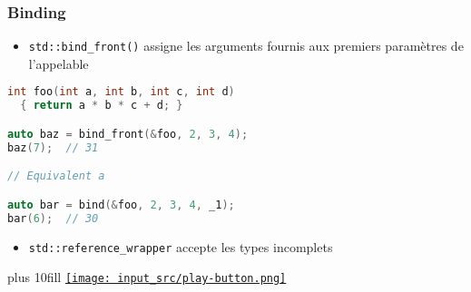\documentclass[C++.tex]{subfiles}
\begin{document}
\begin{frame}[fragile]
	\frametitle{Binding}
	\begin{itemize}
		\item \lstinline|std::bind_front()| assigne les arguments fournis aux premiers paramètres de l'appelable
	\end{itemize}

	\begin{lstlisting}[language=C++]
int foo(int a, int b, int c, int d)
  { return a * b * c + d; }

auto baz = bind_front(&foo, 2, 3, 4);
baz(7);  // 31

// Equivalent a

auto bar = bind(&foo, 2, 3, 4, _1);
bar(6);  // 30\end{lstlisting}

	\begin{itemize}
		\item \lstinline|std::reference_wrapper| accepte les types incomplets

	\end{itemize}

	\vskip 5mm plus 10fill
	\hfill
	\href{https://godbolt.org/#g:!((g:!((g:!((h:codeEditor,i:(filename:'1',fontScale:14,fontUsePx:'0',j:1,lang:c%2B%2B,selection:(endColumn:1,endLineNumber:19,positionColumn:1,positionLineNumber:19,selectionStartColumn:1,selectionStartLineNumber:1,startColumn:1,startLineNumber:1),source:'%23include+%3Cfunctional%3E%0A%23include+%3Ciostream%3E%0A%0Aint+foo(int+a,+int+b,+int+c,+int+d)%0A%7B%0A++return+a+*+b+*+c+%2B+d%3B%0A%7D%0A%0Aint+main()%0A%7B%0A++std::cout+%3C%3C+foo(2,+3,+4,+5)+%3C%3C+%22%5Cn%22%3B%0A%0A++auto+bar+%3D+std::bind(%26foo,+2,+3,+4,+std::placeholders::_1)%3B%0A++std::cout+%3C%3C+bar(6)+%3C%3C+%22%5Cn%22%3B%0A%0A++auto+baz+%3D+std::bind_front(%26foo,+2,+3,+4)%3B%0A++std::cout+%3C%3C+baz(7)+%3C%3C+%22%5Cn%22%3B%0A%7D%0A'),l:'5',n:'0',o:'C%2B%2B+source+%231',t:'0')),k:50,l:'4',n:'0',o:'',s:0,t:'0'),(g:!((h:executor,i:(argsPanelShown:'1',compilationPanelShown:'0',compiler:g122,compilerName:'',compilerOutShown:'0',execArgs:'',execStdin:'',fontScale:14,fontUsePx:'0',j:1,lang:c%2B%2B,libs:!((name:boost,ver:'175')),options:'-std%3Dc%2B%2B20+-Wall+-Wextra+-pedantic',source:1,stdinPanelShown:'1',tree:'1',wrap:'0'),l:'5',n:'0',o:'Executor+x86-64+gcc+12.2+(C%2B%2B,+Editor+%231)',t:'0')),header:(),k:50,l:'4',n:'0',o:'',s:0,t:'0')),l:'2',n:'0',o:'',t:'0')),version:4}{\texttt{[image: input\_src/play-button.png]}}
\end{frame}
\end{document}

